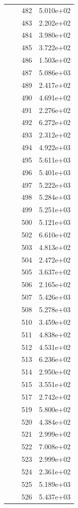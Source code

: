 \documentclass[12pt]{article}
\begin{document}
\begin{longtable}{@{}cccc@{}}
 &  & 482 & 5.010e+02 \\
 &  & 483 & 2.202e+02 \\
 &  & 484 & 3.980e+02 \\
 &  & 485 & 3.722e+02 \\
 &  & 486 & 1.503e+02 \\
 &  & 487 & 5.086e+03 \\
 &  & 489 & 2.417e+02 \\
 &  & 490 & 4.691e+02 \\
 &  & 491 & 2.276e+02 \\
 &  & 492 & 6.272e+02 \\
 &  & 493 & 2.312e+02 \\
 &  & 494 & 4.922e+03 \\
 &  & 495 & 5.611e+03 \\
 &  & 496 & 5.401e+03 \\
 &  & 497 & 5.222e+03 \\
 &  & 498 & 5.284e+03 \\
 &  & 499 & 5.251e+03 \\
 &  & 500 & 5.121e+03 \\
 &  & 502 & 6.610e+02 \\
 &  & 503 & 4.813e+02 \\
 &  & 504 & 2.472e+02 \\
 &  & 505 & 3.637e+02 \\
 &  & 506 & 2.165e+02 \\
 &  & 507 & 5.426e+03 \\
 &  & 508 & 5.278e+03 \\
 &  & 510 & 3.459e+02 \\
 &  & 511 & 4.838e+02 \\
 &  & 512 & 4.531e+02 \\
 &  & 513 & 6.236e+02 \\
 &  & 514 & 2.950e+02 \\
 &  & 515 & 3.551e+02 \\
 &  & 517 & 2.742e+02 \\
 &  & 519 & 5.800e+02 \\
 &  & 520 & 4.384e+02 \\
 &  & 521 & 2.999e+02 \\
 &  & 522 & 7.008e+02 \\
 &  & 523 & 2.999e+02 \\
 &  & 524 & 2.361e+02 \\
 &  & 525 & 5.189e+03 \\
 &  & 526 & 5.437e+03 \\

\end{longtable}
\end{document}
